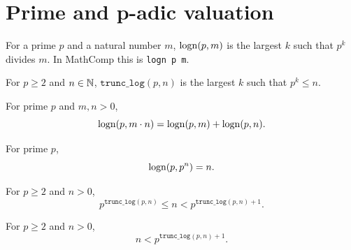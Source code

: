 
\section{Prime and p-adic valuation}

\begin{definition}
  \label{def:logn}
  \rocqok
  For a prime $p$ and a natural number $m$, $\operatorname{logn}(p, m)$ is the
  largest $k$ such that $p^k$ divides $m$. In MathComp this is
  \texttt{logn p m}.
\end{definition}

\begin{definition}
  \label{def:trunc_log}
  \rocqok
  For $p \geq 2$ and $n \in \mathbb{N}$, $\texttt{trunc\_log}(p, n)$ is
  the largest $k$ such that $p^k \leq n$.
\end{definition}

\begin{lemma}
  \label{lem:lognM}
  \rocqok
  For prime $p$ and $m, n > 0$,
  \[
    \operatorname{logn}(p, m \cdot n) = \operatorname{logn}(p, m) + \operatorname{logn}(p, n).
  \]
\end{lemma}

\begin{lemma}
  \label{lem:pfactorK}
  \rocqok
  For prime $p$,
  \[
    \operatorname{logn}(p, p^n) = n.
  \]
\end{lemma}

\begin{lemma}
  \label{lem:trunc_log_bounds}
  \rocqok
  For $p \geq 2$ and $n > 0$,
  \[
    p^{\texttt{trunc\_log}(p, n)} \leq n < p^{\texttt{trunc\_log}(p, n) + 1}.
  \]
\end{lemma}

\begin{lemma}
  \label{lem:trunc_log_ltn}
  \rocqok
  For $p \geq 2$ and $n > 0$,
  \[
    n < p^{\texttt{trunc\_log}(p, n) + 1}.
  \]
\end{lemma}


